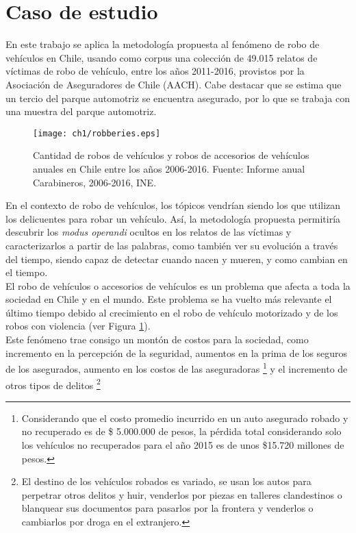 \documentclass[letterpaper,12pt,oneside]{book} %
\begin{document}
\section{Caso de estudio}

En este trabajo se aplica la metodología propuesta al fenómeno de robo de vehículos en Chile, usando como corpus una colección de 49.015 relatos de víctimas de robo de vehículo, entre los años 2011-2016, provistos por la Asociación de Aseguradores de Chile (AACH). Cabe destacar que se estima que un tercio del parque automotriz se encuentra asegurado, por lo que se trabaja con una muestra del parque automotriz.\\

\begin{figure}
    \texttt{[image: ch1/robberies.eps]} 
    \caption{Cantidad de robos de vehículos y robos de accesorios de vehículos anuales en Chile entre los años 2006-2016. Fuente: Informe anual Carabineros, 2006-2016, INE.} 
    \label{fig:antecedente}
\end{figure}

En el contexto de robo de vehículos, los tópicos vendrían siendo los  que utilizan los delicuentes para robar un vehículo. Así, la metodología propuesta permitiría descubrir los \textit{modus operandi} ocultos en los relatos de las víctimas y caracterizarlos a partir de las palabras, como también ver su evolución a través del tiempo, siendo capaz de detectar cuando nacen y mueren, y como cambian en el tiempo.\\

El robo de vehículos o accesorios de vehículos es un problema que afecta a toda la sociedad en Chile y en el mundo. Este problema se ha vuelto más relevante el último tiempo debido al crecimiento en el robo de vehículo motorizado y de los robos con violencia (ver Figura \ref{fig:antecedente}).\\ 

Este fenómeno trae consigo un montón de costos para la sociedad, como incremento en la percepción de la seguridad, aumentos en la prima de los seguros de los asegurados, aumento en los costos de las aseguradoras \footnote{Considerando que el costo promedio incurrido en un auto asegurado robado y no recuperado es de \$ 5.000.000 de pesos, la pérdida total considerando solo los vehículos no recuperados para el año 2015 es de unos \$15.720 millones de pesos.} y el incremento de otros tipos de delitos \footnote{El destino de los vehículos robados es variado, se usan los autos para perpetrar otros delitos y huir, venderlos por piezas en talleres clandestinos o blanquear sus documentos para pasarlos por la frontera y venderlos o cambiarlos por droga en el extranjero.}
\end{document}
